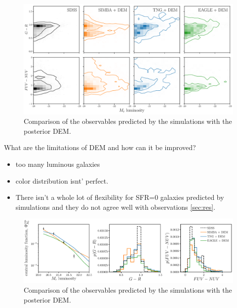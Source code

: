 \begin{figure}
\begin{center}
    \includegraphics[width=\textwidth]{figs/abc_observables.pdf}
    \caption{Comparison of the observables predicted by the simulations with
    the posterior DEM.}
\label{fig:dem}
\end{center}
\end{figure}


What are the limitations of DEM and how can it be improved? 
\begin{itemize}
    \item too many luminous galaxies
    \item color distribution isnt' perfect. 
    \item There isn't a whole lot of flexibility for SFR=0 galaxies predicted by
    simulations and they do not agree well with observations \ref{sec:res}. 
\end{itemize}


\begin{figure}
\begin{center}
    \includegraphics[width=\textwidth]{figs/abc_observables_1d.pdf}
    \caption{Comparison of the observables predicted by the simulations with
    the posterior DEM.}
\label{fig:dem1d}
\end{center}
\end{figure}




